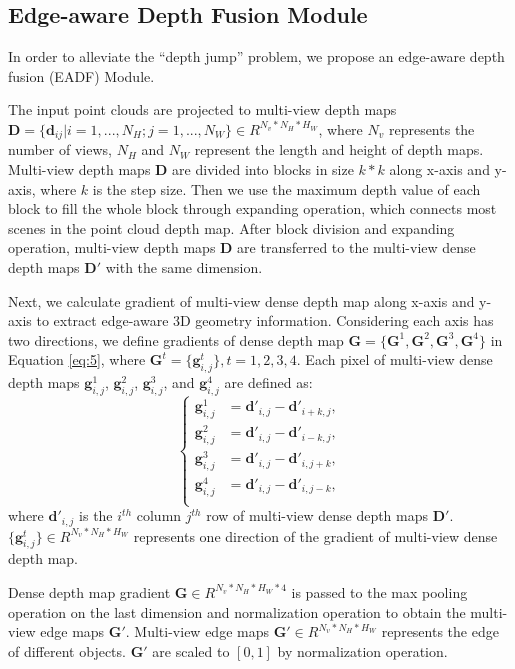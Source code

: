 \documentclass[letterpaper]{article} \usepackage[submission]{aaai24}  \usepackage{times}  \usepackage{helvet}  \usepackage{courier}  \usepackage[hyphens]{url}  \usepackage{graphicx} \urlstyle{rm} \def\UrlFont{\rm}  \usepackage{natbib}  \usepackage{caption} \frenchspacing  \setlength{\pdfpagewidth}{8.5in} \setlength{\pdfpageheight}{11in} \usepackage{algorithm}
\begin{document}
\subsection{Edge-aware Depth Fusion Module}
In order to alleviate the ``depth jump'' problem, we propose an edge-aware depth fusion (EADF) Module.

The input point clouds are projected to multi-view depth maps $ \mathbf{D}=\{\mathbf{d}_{ij}|i=1,...,N_H; j=1,...,N_W\} \in R^{N_v*N_H*H_W}$, where $N_v$ represents the number of views, $N_H$ and $N_W$ represent the length and height of depth maps. 
Multi-view depth maps $\mathbf{D}$ are divided into blocks in size $k*k$ along x-axis and y-axis, where $k$ is the step size. Then we use the maximum depth value of each block to fill the whole block through expanding operation, which connects most scenes in the point cloud depth map. After block division and expanding operation,  multi-view depth maps $\mathbf{D}$ are transferred to the multi-view dense depth maps $\mathbf{D'}$ with the same dimension.

Next, we calculate gradient of multi-view dense depth map along x-axis and y-axis to extract edge-aware 3D geometry information. Considering each axis has two directions, we define gradients of dense depth map $\mathbf{G}=\{\mathbf{G}^1,\mathbf{G}^2,\mathbf{G}^3,\mathbf{G}^4\}$ in Equation \ref{eq:5}, where $\mathbf{G}^t=\{ \mathbf{g}^t_{i,j}\}, t=1,2,3,4$. Each pixel of multi-view dense depth maps $\mathbf{g}^1_{i,j}$, $\mathbf{g}^2_{i,j}$, $\mathbf{g}^3_{i,j}$, and $\mathbf{g}^4_{i,j}$ are defined as:
\begin{equation} \label{eq:5}
\left\{
\begin{array}{llll}
\mathbf{g}^1_{i,j} &=\mathbf{d'}_{i,j} - \mathbf{d'}_{i+k,j},  \\ 
\mathbf{g}^2_{i,j} &=\mathbf{d'}_{i,j} - \mathbf{d'}_{i-k,j},  \\
\mathbf{g}^3_{i,j} &=\mathbf{d'}_{i,j} - \mathbf{d'}_{i,j+k},  \\
\mathbf{g}^4_{i,j} &=\mathbf{d'}_{i,j} - \mathbf{d'}_{i,j-k},  \\
\end{array}\right.
\end{equation}
where $\mathbf{d'}_{i,j}$ is the $i^{th}$ column $j^{th}$ row of  multi-view dense depth maps $\mathbf{D'}$. $\{\mathbf{g}^t_{i,j}\}\in R^{N_v*N_H*H_W}$ represents one direction of the gradient of multi-view dense depth map.

Dense depth map gradient $ \mathbf{G} \in R^{N_v*N_H*H_W*4}$ is passed to the max pooling operation on the last dimension and normalization operation to obtain the multi-view edge maps $\mathbf{G'}$. 
Multi-view edge maps $\mathbf{G'} \in R^{N_v*N_H*H_W}$ represents the edge of different objects. $\mathbf{G'}$ are scaled to $\left[ 0,1 \right] $ by normalization operation. 
\end{document}

